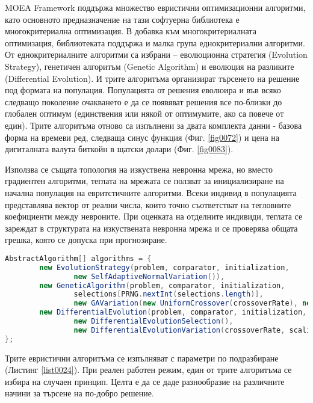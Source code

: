 MOEA Framework поддържа множество евристични оптимизационни алгоритми, като основното предназначение на тази софтуерна библиотека е многокритериална оптимизация. В добавка към многокритериалната оптимизация, библиотеката поддържа и малка група еднокритериални алгоритми. От еднокритериалните алгоритми са избрани – еволюционна стратегия (Evolution Strategy), генетичен алгоритъм (Genetic Algorithm) и еволюция на разликите (Differential Evolution). И трите алгоритъма организират търсенето на решение под формата на популация. Популацията от решения еволюира и във всяко следващо поколение очакването е да се появяват решения все по-близки до глобален оптимум (единствения или някой от оптимумите, ако са повече от един). Трите алгоритъма отново са изпълнени за двата комплекта данни - базова форма на времеви ред, следваща синус функция (Фиг. \ref{fig0072}) и цена на дигиталната валута биткойн в щатски долари (Фиг. \ref{fig0083}).

Използва се същата топология на изкуствена невронна мрежа, но вместо градиентен алгоритми, теглата на мрежата се ползват за инициализиране на начална популация на евритстичните алгоритми. Всеки индивид в популацията представлява вектор от реални числа, които точно съответстват на тегловните коефициенти между невроните. При оценката на отделните индивиди, теглата се зареждат в структурата на изкуствената невронна мрежа и се проверява общата грешка, която се допуска при прогнозиране. 

\begin{lstlisting}[caption=Евристични алгоритми, language=Java, basicstyle=\tiny, label=list0024]
AbstractAlgorithm[] algorithms = {
        new EvolutionStrategy(problem, comparator, initialization,
                new SelfAdaptiveNormalVariation()),
        new GeneticAlgorithm(problem, comparator, initialization,
                selections[PRNG.nextInt(selections.length)],
                new GAVariation(new UniformCrossover(crossoverRate), new Insertion(mutationRate))),
        new DifferentialEvolution(problem, comparator, initialization,
                new DifferentialEvolutionSelection(),
                new DifferentialEvolutionVariation(crossoverRate, scalingFactor))
};
\end{lstlisting}

Трите евристични алгоритъма се изпълняват с параметри по подразбиране (Листинг \ref{list0024}). При реален работен режим, един от трите алгоритъма се избира на случаен принцип. Целта е да се даде разнообразие на различните начини за търсене на  по-добро решение. 

